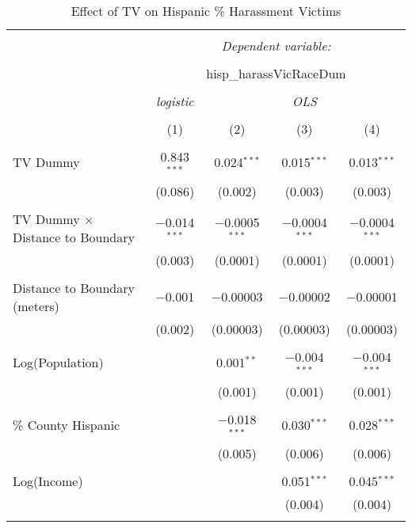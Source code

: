 
\begin{table}[!htbp] \centering 
  \caption{Effect of TV on Hispanic \% Harassment Victims} 
  \label{} 
\begin{tabular}{@{\extracolsep{-2pt}}lcccc} 
\\[-1.8ex]\hline 
\hline \\[-1.8ex] 
 & \multicolumn{4}{c}{\textit{Dependent variable:}} \\ 
\cline{2-5} 
\\[-1.8ex] & \multicolumn{4}{c}{hisp\_harassVicRaceDum} \\ 
\\[-1.8ex] & \textit{logistic} & \multicolumn{3}{c}{\textit{OLS}} \\ 
\\[-1.8ex] & (1) & (2) & (3) & (4)\\ 
\hline \\[-1.8ex] 
 TV Dummy & 0.843$^{***}$ & 0.024$^{***}$ & 0.015$^{***}$ & 0.013$^{***}$ \\ 
  & (0.086) & (0.002) & (0.003) & (0.003) \\ 
  & & & & \\ 
 TV Dummy $\times$ Distance to Boundary & $-$0.014$^{***}$ & $-$0.0005$^{***}$ & $-$0.0004$^{***}$ & $-$0.0004$^{***}$ \\ 
  & (0.003) & (0.0001) & (0.0001) & (0.0001) \\ 
  & & & & \\ 
 Distance to Boundary (meters) & $-$0.001 & $-$0.00003 & $-$0.00002 & $-$0.00001 \\ 
  & (0.002) & (0.00003) & (0.00003) & (0.00003) \\ 
  & & & & \\ 
 Log(Population) &  & 0.001$^{**}$ & $-$0.004$^{***}$ & $-$0.004$^{***}$ \\ 
  &  & (0.001) & (0.001) & (0.001) \\ 
  & & & & \\ 
 \% County Hispanic &  & $-$0.018$^{***}$ & 0.030$^{***}$ & 0.028$^{***}$ \\ 
  &  & (0.005) & (0.006) & (0.006) \\ 
  & & & & \\ 
 Log(Income) &  &  & 0.051$^{***}$ & 0.045$^{***}$ \\ 
  &  &  & (0.004) & (0.004) \\ 
  & & & & \\ 

\end{tabular}
\end{table}
